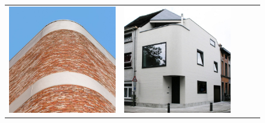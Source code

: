 \begin{figure}[H]
{\begin{tabular}{@{}ccccc@{}}
      \includegraphics[width=\linewidth]{Images/LoRAs/Ghoek/Training_images/3.jpg} &
      \includegraphics[width=\linewidth]{Images/LoRAs/Ghoek/Training_images/4.jpg} &

\end{tabular}}
\end{figure}
